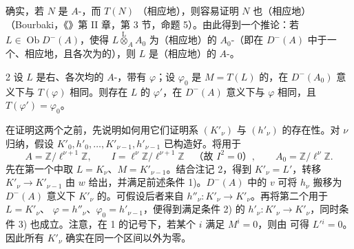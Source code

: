 确实，若 $N$ 是 $A$-，而 $T(N)$ （相应地），则容易证明 $N$ 也（相应地）（Bourbaki，《》第 II 章，第 3 节，命题 5）。由此得到一个推论：若 $L\in\operatorname{Ob}D^-(A)$，使得 $L\mathbin{\overset{\mathrm L}{\otimes}}_AA_0$ 为（相应地）的 $A_0$-（即在 $D^-(A)$ 中于一个、相应地，且各次为的），则 $L$ 是（相应地）的 $A$-。
\begin{SGAresult}{}{2}
设 $L$ 是右、各次均的 $A$-，带有 $\varphi$；设 $\varphi_0$ 是 $M=T(L)$ 的，在 $D^-(A_0)$ 意义下与 $T(\varphi)$ 相同。则存在 $L$ 的 $\varphi'$，在 $D^-(A)$ 意义下与 $\varphi$ 相同，且 $T(\varphi')=\varphi_0$。
\end{SGAresult}
在证明这两个之前，先说明如何用它们证明系 $(K'_\nu)$ 与 $(h'_\nu)$ 的存在性。对 $\nu$ 归纳，假设 $K'_0,h'_0,\ldots,K'_{\nu-1},h'_{\nu-1}$ 已构造好。将用于
\[
A=\mathbb Z/\ell^{\nu+1}\mathbb Z,\qquad
I=\ell^\nu\mathbb Z/\ell^{\nu+1}\mathbb Z\quad\text{（故 $I^2=0$）},\qquad
A_0=\mathbb Z/\ell^\nu\mathbb Z.
\]
先在第一个中取 $L=K_\nu$、$M=K'_{\nu-1}$。结合注记 2，得到 $K'_\nu=L'$，转移 $K'_\nu\to K'_{\nu-1}$ 由 $w$ 给出，并满足前述条件 1)。$D^-(A)$ 中的 $v$ 可将 $h_\nu$ 搬移为 $D^-(A)$ 意义下 $K'_\nu$ 的。可假设后者来自 $h''_\nu:K'_\nu\to K'_\nu$。再将第二个用于 $L=K'_\nu$、
$\varphi=h''_\nu$、$\varphi_0=h'_{\nu-1}$，便得到满足条件 2) 的 $h'_\nu:K'_\nu\to K'_\nu$，同时条件 3) 也成立。注意，在 1 的记号下，若某个 $i$ 满足 $M^i=0$，则由 可得 $L'{}^i=0$。因此所有 $K'_\nu$ 确实在同一个区间以外为零。


